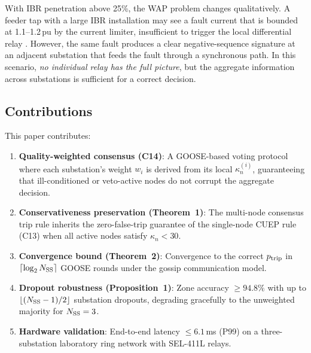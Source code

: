 \documentclass[journal]{IEEEtran}
\newcommand{\kappan}{\kappa_{n}}
\newcommand{\NSS}{N_{\rm SS}}
\begin{document}
With IBR penetration above 25\%, the WAP problem changes
qualitatively.  A feeder tap with a large IBR installation may see
a fault current that is bounded at 1.1--1.2\,pu by the current
limiter, insufficient to trigger the local differential relay
\cite{hooshyar2019inverter}.  However, the same fault produces a
clear negative-sequence signature at an adjacent substation that
feeds the fault through a synchronous path.  In this scenario,
\emph{no individual relay has the full picture}, but the aggregate
information across substations is sufficient for a correct decision.

\subsection{Contributions}

This paper contributes:

\begin{enumerate}
  \item \textbf{Quality-weighted consensus (C14)}: A GOOSE-based
        voting protocol where each substation's weight $w_i$ is
        derived from its local $\kappan^{(i)}$, guaranteeing that
        ill-conditioned or veto-active nodes do not corrupt the
        aggregate decision.

  \item \textbf{Conservativeness preservation (Theorem~1)}: The
        multi-node consensus trip rule inherits the zero-false-trip
        guarantee of the single-node CUEP rule (C13)
        \cite{sambps_c13_cuep} when all active nodes satisfy
        $\kappan < 30$.

  \item \textbf{Convergence bound (Theorem~2)}: Convergence to the
        correct $p_{\rm trip}$ in $\lceil \log_2 \NSS \rceil$
        GOOSE rounds under the gossip communication model.

  \item \textbf{Dropout robustness (Proposition~1)}: Zone accuracy
        $\geq 94.8\%$ with up to $\lfloor (\NSS - 1)/2 \rfloor$
        substation dropouts, degrading gracefully to the
        unweighted majority for $\NSS = 3$.

  \item \textbf{Hardware validation}: End-to-end latency
        $\leq 6.1$\,ms (P99) on a three-substation laboratory
        ring network with SEL-411L relays.
\end{enumerate}

\end{document}
